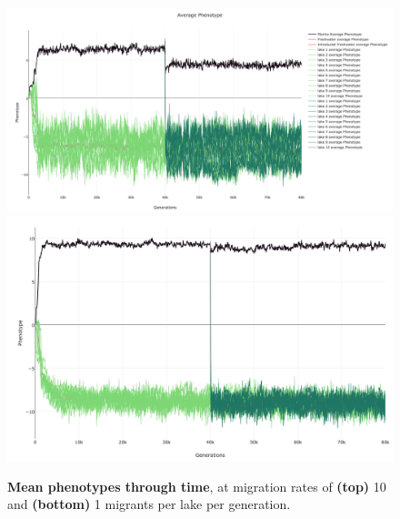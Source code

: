 \documentclass{article}
\begin{document}
\begin{figure}
	\begin{center}
        \includegraphics[width=1.0\linewidth]{plotlyPlots/PhenotypeThroughout5e-2.png}
        \includegraphics[width=1.0\linewidth]{plotlyPlots/PhenotypeThroughout5e-3.png}
  		\caption{
            \textbf{Mean phenotypes through time},
            at migration rates of
            \textbf{(top)} 10 and
            \textbf{(bottom)} 1 migrants per lake per generation.
		}
  		\label{fig:pheno_by_time1}
	\end{center}
\end{figure}
\end{document}
